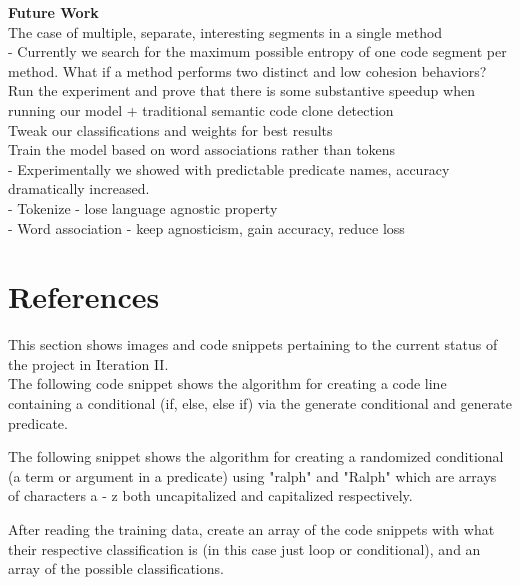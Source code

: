 \documentclass{article}
\begin{document}
    \textbf{Future Work}\\
    The case of multiple, separate, interesting segments in a single method\\
    - Currently we search for the maximum possible entropy of one code segment per method. What if a method performs two distinct and low cohesion behaviors?\\
    Run the experiment and prove that there is some substantive speedup when running our model + traditional semantic code clone detection\\
    Tweak our classifications and weights for best results\\
    Train the model based on word associations rather than tokens\\
    - Experimentally we showed with predictable predicate names, accuracy dramatically increased.\\
    - Tokenize - lose language agnostic property\\
    - Word association - keep agnosticism, gain accuracy, reduce loss\\

    \section{References}
    This section shows images and code snippets pertaining to the current status of the project in Iteration II. \\

    The following code snippet shows the algorithm for creating a code line containing a conditional (if, else, else if) via the generate conditional and generate predicate.
    

    The following snippet shows the algorithm for creating a randomized conditional (a term or argument in a predicate) using "ralph" and "Ralph" which are arrays of characters a - z both uncapitalized and capitalized respectively.
    

    After reading the training data, create an array of the code snippets with what their respective classification is (in this case just loop or conditional), and an array of the possible classifications.
    
\end{document}
